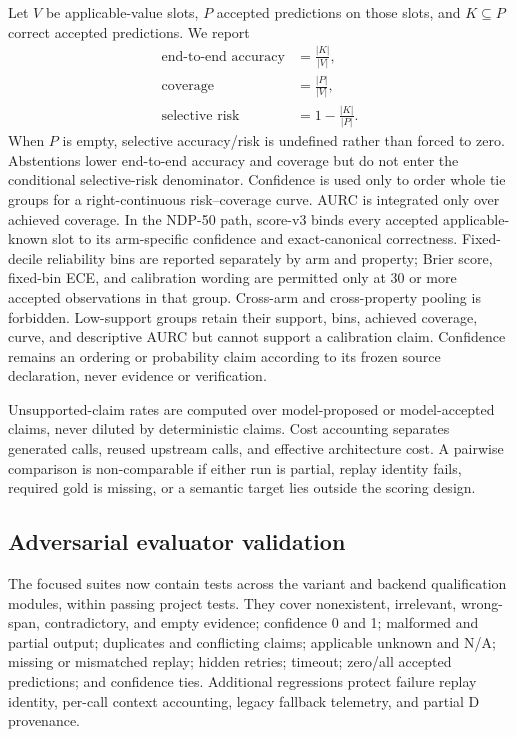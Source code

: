 \documentclass[11pt]{article}
\newcommand{\NA}{\textsf{N/A}}
\begin{document}
Let $V$ be applicable-value slots, $P$ accepted predictions on those slots, and
$K\subseteq P$ correct accepted predictions. We report
\begin{align}
  \text{end-to-end accuracy} &= \frac{\lvert K\rvert}{\lvert V\rvert},\\
  \text{coverage} &= \frac{\lvert P\rvert}{\lvert V\rvert},\\
  \text{selective risk} &= 1-\frac{\lvert K\rvert}{\lvert P\rvert}.
\end{align}
When $P$ is empty, selective accuracy/risk is undefined rather than forced to zero.
Abstentions lower end-to-end accuracy and coverage but do not enter the conditional
selective-risk denominator. Confidence is used only to order whole tie groups for a
right-continuous risk--coverage curve. AURC is integrated only over achieved
coverage. In the NDP-50 path, score-v3 binds every accepted applicable-known
slot to its arm-specific confidence and exact-canonical correctness. Fixed-decile
reliability bins are reported separately by arm and property; Brier score, fixed-bin
ECE, and calibration wording are permitted only at 30 or more accepted observations
in that group. Cross-arm and cross-property pooling is forbidden. Low-support
groups retain their support, bins, achieved coverage, curve, and descriptive AURC
but cannot support a calibration claim. Confidence remains an ordering or
probability claim according to its frozen source declaration, never evidence or
verification.

Unsupported-claim rates are computed over model-proposed or model-accepted claims,
never diluted by deterministic claims. Cost accounting separates generated calls,
reused upstream calls, and effective architecture cost. A pairwise comparison is
non-comparable if either run is partial, replay identity fails, required gold is
missing, or a semantic target lies outside the scoring design.

\subsection{Adversarial evaluator validation}

The focused suites now contain \FocusedTests{} tests across the variant and backend
qualification modules, within \FullTests{} passing project tests. They cover
nonexistent, irrelevant, wrong-span, contradictory, and empty evidence; confidence
0 and 1; malformed and partial output; duplicates and conflicting claims; applicable
unknown and \NA; missing or mismatched replay; hidden retries; timeout; zero/all
accepted predictions; and confidence ties. Additional regressions protect failure
replay identity, per-call context accounting, legacy fallback telemetry, and partial
D provenance.
\end{document}
